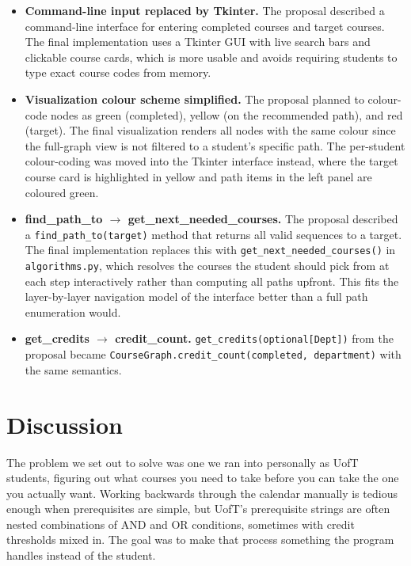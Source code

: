 \documentclass[11pt]{article}
\begin{document}
\begin{itemize}
    \item \textbf{Command-line input replaced by Tkinter.} The proposal described a
    command-line interface for entering completed courses and target courses. The final
    implementation uses a Tkinter GUI with live search bars and clickable course cards, which
    is more usable and avoids requiring students to type exact course codes from memory.

    \item \textbf{Visualization colour scheme simplified.} The proposal planned to
    colour-code nodes as green (completed), yellow (on the recommended path), and red
    (target). The final visualization renders all nodes with the same colour since the
    full-graph view is not filtered to a student's specific path. The per-student
    colour-coding was moved into the Tkinter interface instead, where the target course card
    is highlighted in yellow and path items in the left panel are coloured green.

    \item \textbf{find\_path\_to $\rightarrow$ get\_next\_needed\_courses.} The proposal
    described a \verb|find_path_to(target)| method that returns all valid sequences to a
    target. The final implementation replaces this with \verb|get_next_needed_courses()| in
    \verb|algorithms.py|, which resolves the courses the student should pick from at each
    step interactively rather than computing all paths upfront. This fits the layer-by-layer
    navigation model of the interface better than a full path enumeration would.

    \item \textbf{get\_credits $\rightarrow$ credit\_count.} \verb|get_credits(optional[Dept])|
    from the proposal became \verb|CourseGraph.credit_count(completed, department)| with the
    same semantics.

\end{itemize}

\section*{Discussion}

The problem we set out to solve was one we ran into personally as UofT students, figuring
out what courses you need to take before you can take the one you actually want. Working
backwards through the calendar manually is tedious enough when prerequisites are simple, but
UofT's prerequisite strings are often nested combinations of AND and OR conditions, sometimes
with credit thresholds mixed in. The goal was to make that process something the program
handles instead of the student.
\end{document}
